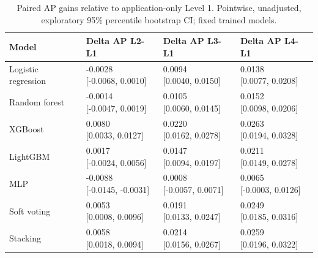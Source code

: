 \begin{table}[htbp]
\centering
\small
\caption{Paired AP gains relative to application-only Level 1. Pointwise, unadjusted, exploratory 95\% percentile bootstrap CI; fixed trained models.}
\label{tab:rq2-baseline-gains}
\begin{tabular}{llll}
\toprule
Model & Delta AP L2-L1 & Delta AP L3-L1 & Delta AP L4-L1 \\
\midrule
Logistic regression & \shortstack{{-0.0028} \\ {[-0.0068, 0.0010]}} & \shortstack{{0.0094} \\ {[0.0040, 0.0150]}} & \shortstack{{0.0138} \\ {[0.0077, 0.0208]}} \\
Random forest & \shortstack{{-0.0014} \\ {[-0.0047, 0.0019]}} & \shortstack{{0.0105} \\ {[0.0060, 0.0145]}} & \shortstack{{0.0152} \\ {[0.0098, 0.0206]}} \\
XGBoost & \shortstack{{0.0080} \\ {[0.0033, 0.0127]}} & \shortstack{{0.0220} \\ {[0.0162, 0.0278]}} & \shortstack{{0.0263} \\ {[0.0194, 0.0328]}} \\
LightGBM & \shortstack{{0.0017} \\ {[-0.0024, 0.0056]}} & \shortstack{{0.0147} \\ {[0.0094, 0.0197]}} & \shortstack{{0.0211} \\ {[0.0149, 0.0278]}} \\
MLP & \shortstack{{-0.0088} \\ {[-0.0145, -0.0031]}} & \shortstack{{0.0008} \\ {[-0.0057, 0.0071]}} & \shortstack{{0.0065} \\ {[-0.0003, 0.0126]}} \\
Soft voting & \shortstack{{0.0053} \\ {[0.0008, 0.0096]}} & \shortstack{{0.0191} \\ {[0.0133, 0.0247]}} & \shortstack{{0.0249} \\ {[0.0185, 0.0316]}} \\
Stacking & \shortstack{{0.0058} \\ {[0.0018, 0.0094]}} & \shortstack{{0.0214} \\ {[0.0156, 0.0267]}} & \shortstack{{0.0259} \\ {[0.0196, 0.0322]}} \\
\bottomrule
\end{tabular}
\end{table}
